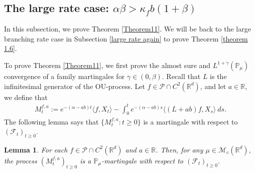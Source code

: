 \documentclass[12pt,a4paper]{amsart}
\theoremstyle{plain}
\newtheorem{lem}[thm]{Lemma}
\theoremstyle{definition}
\numberwithin{equation}{section}
\begin{document}
\subsection{The large rate case: $\alpha \beta > \kappa_f b (1+\beta)$}

In this subsection, we prove Theorem \ref{Theorem11}. We will be back to the large branching rate case in Subsection \ref{large rate again} to prove Theorem \ref{theorem 1.6}.

To prove Theorem \ref{Theorem11}, we first prove the almost sure and $L^{1+\gamma}(\mathbb{P}_{\mu})$ convergence of a family martingales for $\gamma\in (0, \beta)$. Recall that $L$ is the infinitesimal generator of the OU-process. Let $f\in \mathcal{P}\cap C^2(\mathbb R^d)$, and let $a\in \mathbb R$, we define that
\begin{equation}\begin{split}
\label{defmartingale}
    M_t^{f,a}:=e^{-(\alpha-ab)t}\langle f,X_t\rangle-\int_0^t e^{-(\alpha-ab)s}\langle (L+ab)f, X_s\rangle~ ds.
\end{split}\end{equation}
    The following lemma says that $\{M_t^{f,a}: t\geq 0\}$ is a martingale with respect to $(\mathscr{F}_t)_{t\geq 0}$.
\begin{lem}
\label{lemma25}
    For each $f\in \mathcal{P}\cap C^2(\mathbb R^d)$ and $a\in \mathbb R$.
Then, for any $\mu\in \mathcal M_c(\mathbb R^d)$, the process $(M_t^{f,a})_{t\geq 0}$ is a $\mathbb P_\mu$-martingale with respect to $(\mathscr F_t)_{t\geq 0}$.
\end{lem}
\end{document}
